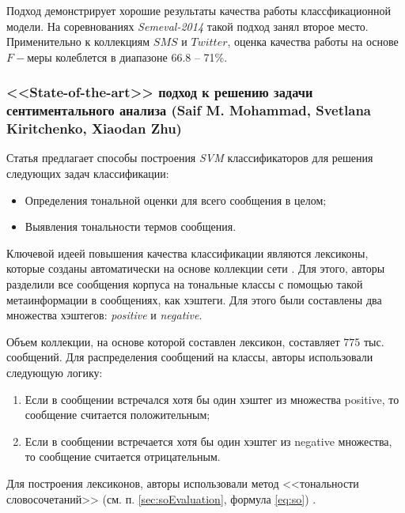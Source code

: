     Подход демонстрирует хорошие результаты качества работы классфикационной
    модели. На соревнованиях {\it Semeval-2014} такой подход занял второе
    место.
    Применительно к коллекциям $SMS$ и $Twitter$, оценка качества работы на
    основе $F-$меры колеблется в диапазоне 66.8 -- 71\%.

    \subsubsection{<<State-of-the-art>> подход к решению задачи
        сентиментального анализа (Saif M. Mohammad, Svetlana Kiritchenko, Xiaodan Zhu)}

    Статья \cite{modernApproach} предлагает способы построения {\it SVM}
    классификаторов для решения следующих задач классификации:
    \begin{itemize}
        \item Определения тональной оценки для всего сообщения в целом;
        \item Выявления тональности термов сообщения.
    \end{itemize}

    Ключевой идеей повышения качества классификации являются лексиконы,
    которые созданы автоматически на основе коллекции сети \twitter.
    Для этого, авторы разделили все сообщения корпуса на тональные классы с
    помощью такой метаинформации в сообщениях, как хэштеги.
    Для этого были составлены два множества хэштегов: {\it positive} и
    {\it negative}.

    Объем коллекции, на основе которой составлен лексикон, составляет $775$
    тыс. сообщений. Для распределения сообщений на классы, авторы использовали
    следующую логику:
    \begin{enumerate}
        \item Если в сообщении встречался хотя бы один хэштег из множества positive, то
            сообщение считается положительным;
        \item Если в сообщении встречается хотя бы один хэштег из negative множества, то
            сообщение считается отрицательным.
    \end{enumerate}

    Для построения лексиконов, авторы использовали метод <<тональности словосочетаний>>
    (см. п. \ref{sec:soEvaluation}, формула \ref{eq:so}) \cite{lexiconSO}.


